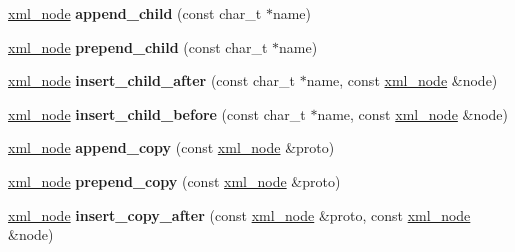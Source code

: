 \begin{DoxyCompactItemize}
\item 
\mbox{\label{classpugi_1_1xml__node_a448342425806a4ad8068bf98fd4ff462}} 
\hyperlink{classpugi_1_1xml__node}{xml\+\_\+node} {\bfseries append\+\_\+child} (const char\+\_\+t $\ast$name)
\item 
\mbox{\label{classpugi_1_1xml__node_afa78286431f99a0f35b18185e11e28e8}} 
\hyperlink{classpugi_1_1xml__node}{xml\+\_\+node} {\bfseries prepend\+\_\+child} (const char\+\_\+t $\ast$name)
\item 
\mbox{\label{classpugi_1_1xml__node_a778c2246fef9964b2d947253a86f2982}} 
\hyperlink{classpugi_1_1xml__node}{xml\+\_\+node} {\bfseries insert\+\_\+child\+\_\+after} (const char\+\_\+t $\ast$name, const \hyperlink{classpugi_1_1xml__node}{xml\+\_\+node} \&node)
\item 
\mbox{\label{classpugi_1_1xml__node_a70fa68762aed11c82a1b913571df4394}} 
\hyperlink{classpugi_1_1xml__node}{xml\+\_\+node} {\bfseries insert\+\_\+child\+\_\+before} (const char\+\_\+t $\ast$name, const \hyperlink{classpugi_1_1xml__node}{xml\+\_\+node} \&node)
\item 
\mbox{\label{classpugi_1_1xml__node_a17971e2b69c4dd4f45c461ebffe96732}} 
\hyperlink{classpugi_1_1xml__node}{xml\+\_\+node} {\bfseries append\+\_\+copy} (const \hyperlink{classpugi_1_1xml__node}{xml\+\_\+node} \&proto)
\item 
\mbox{\label{classpugi_1_1xml__node_a29cc787ee2270e3a71e1d511164621e6}} 
\hyperlink{classpugi_1_1xml__node}{xml\+\_\+node} {\bfseries prepend\+\_\+copy} (const \hyperlink{classpugi_1_1xml__node}{xml\+\_\+node} \&proto)
\item 
\mbox{\label{classpugi_1_1xml__node_a106a600eac7d08608f797d034b331fa8}} 
\hyperlink{classpugi_1_1xml__node}{xml\+\_\+node} {\bfseries insert\+\_\+copy\+\_\+after} (const \hyperlink{classpugi_1_1xml__node}{xml\+\_\+node} \&proto, const \hyperlink{classpugi_1_1xml__node}{xml\+\_\+node} \&node)
\item 
\mbox{\label{classpugi_1_1xml__node_a21134448747e00888df7ecfb174032d3}} 

\end{DoxyCompactItemize}

